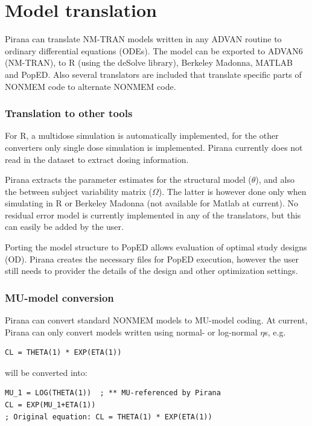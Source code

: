 {{{{%
\section{Model translation}
Pirana can translate NM-TRAN models written in any ADVAN routine to
ordinary differential equations (ODEs). The model can be exported to
ADVAN6 (NM-TRAN), to R (using the deSolve library), Berkeley Madonna,
MATLAB and PopED. Also several translators are included that
translate specific parts of NONMEM code to alternate NONMEM code.

\subsubsection*{Translation to other tools}
For R, a multidose simulation is automatically implemented, for the
other converters only single dose simulation is implemented. Pirana
currently does not read in the dataset to extract dosing information.

Pirana extracts the parameter estimates for the structural model
($\theta$), and also the between subject variability matrix
($\Omega$). The latter is however done only when simulating in R or Berkeley Madonna (not available for Matlab at current).
No residual error model is currently implemented in any of the translators, but this can easily be added by the user. 

Porting the model structure to PopED allows evaluation of optimal
study designs (OD). Pirana creates the necessary files for PopED execution, however
the user still needs to provider the details of the design and other optimization settings.

\subsubsection*{MU-model conversion}
Pirana can convert standard NONMEM models to MU-model coding. At
current, Pirana can only convert models written using normal- or
log-normal $\eta$s, e.g.

\begin{lstlisting}
CL = THETA(1) * EXP(ETA(1))
\end{lstlisting}

will be converted into:

\begin{lstlisting}
MU_1 = LOG(THETA(1))  ; ** MU-referenced by Pirana
CL = EXP(MU_1+ETA(1)) 
; Original equation: CL = THETA(1) * EXP(ETA(1))
\end{lstlisting}

}}}}
